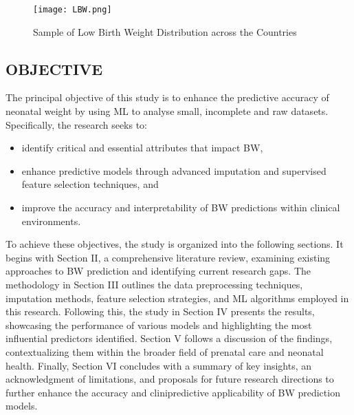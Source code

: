 \documentclass[12pt]{article}
\begin{document}
\begin{figure}[H]
    \centering
    \texttt{[image: LBW.png]} 
    \caption{ Sample of Low Birth Weight Distribution across the Countries}
    \label{fig:LBW}
\end{figure}

\subsection{OBJECTIVE}

The principal objective of this study is to enhance the predictive accuracy of neonatal weight by using ML to analyse small, incomplete and raw datasets. Specifically, the research seeks to: 
\begin{itemize}
    \item identify critical and essential attributes that impact BW,
    \item enhance predictive models through advanced imputation and supervised feature selection techniques, and
    \item improve the accuracy and interpretability of BW predictions within clinical environments.
\end{itemize}
To achieve these objectives, the study is organized into the following sections.  It begins with Section II, a comprehensive literature review, examining existing approaches to BW prediction and identifying current research gaps. The methodology in Section III outlines the data preprocessing techniques, imputation methods, feature selection strategies, and ML algorithms employed in this research. Following this, the study in Section IV presents the results, showcasing the performance of various models and highlighting the most influential predictors identified. Section V follows a discussion of the findings, contextualizing them within the broader field of prenatal care and neonatal health. Finally, Section VI concludes with a summary of key insights, an acknowledgment of limitations, and proposals for future research directions to further enhance the accuracy and clinipredictive applicability of BW prediction models.
\end{document}

